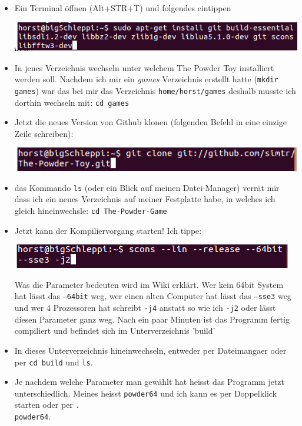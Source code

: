 \begin{itemize}
\item Ein Terminal öffnen (Alt+STR+T) und folgendes eintippen 
\begin{center}
\includegraphics[width=\linewidth]{powdertoy/zeile1.png}
\end{center}
\item In jenes Verzeichnis wechseln unter welchem The Powder Toy installiert werden soll. Nachdem ich mir ein \textit{games} Verzeichnis erstellt hatte (\texttt{mkdir games}) war das bei mir das Verzeichnis \texttt{home/horst/games} deshalb musste ich dorthin wechseln mit: \texttt{cd games}  
\item Jetzt die neues Version von Github klonen (folgenden Befehl in eine einzige Zeile schreiben):
\begin{center}
\includegraphics[width=\linewidth]{powdertoy/zeile2.png}
\end{center}
\item das Kommando \texttt{ls} (oder ein Blick auf meinen Datei-Manager) verrät mir dass ich ein neues Verzeichnis auf meiner Festplatte habe, in welches ich gleich hineinwechsle: \texttt{cd The-Powder-Game}
\item Jetzt kann der Kompiliervorgang starten! Ich tippe:
\begin{center}
\includegraphics[width=\linewidth]{powdertoy/zeile3.png}
\end{center} Was die Parameter bedeuten wird im Wiki erklärt. Wer kein 64bit System hat lässt das \texttt{--64bit} weg, wer einen alten Computer hat lässt das \texttt{--sse3} weg und wer 4 Prozessoren hat schreibt \texttt{-j4} anstatt so wie ich \texttt{-j2} oder lässt diesen Parameter ganz weg. Nach ein paar Minuten ist das Programm fertig compiliert und befindet sich im Unterverzeichnis 'build'
\item In dieses Unterverzeichnis hineinwechseln, entweder per Dateimangaer oder per \texttt{cd build} und \texttt{ls}.
\item Je nachdem welche Parameter man gewählt hat heisst das Programm jetzt unterschiedlich. Meines heisst \texttt{powder64} und ich kann es per Doppelklick starten oder per \texttt{.\\powder64}.
\end{itemize}
